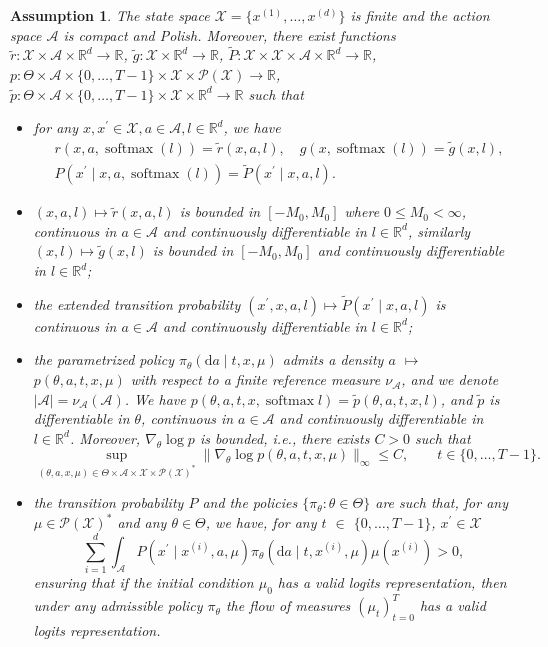 \documentclass[11pt]{article}
\numberwithin{equation}{section}
\newtheorem{assumption}{Assumption}
\theoremstyle{definition}
\theoremstyle{remark}
\def\cA{\mathcal{A}}
\def\cP{\mathcal{P}}
\def\cX{\mathcal{X}}
\def\d{{\mathrm{d}}}
\def\R{{\mathbb R}}
\DeclareMathOperator*{\softmax}{softmax}
\begin{document}
\begin{assumption}
\label{assumption:finite-state-space}
The state space $\cX = \{x^{(1)}, \ldots, x^{(d)} \}$ is finite and the action space $\cA$ is compact and Polish. 
Moreover, there exist functions $\tilde r: \cX \times \cA \times \R^d \to \R$, $\tilde g: \cX \times \R^d \to \R$, $\tilde P: \cX \times \cX \times \cA \times \R^d \to \R$, $p: \Theta \times \cA \times \{0, \ldots, T-1\} \times \cX \times \cP (\cX) \to \R$, $\tilde p: \Theta \times \cA \times \{0, \ldots, T-1\} \times \cX \times \R^d \to \R$ such that
    \begin{itemize}
        \item for any $x,x^\prime \in \cX, a \in \cA, l \in \R^d$, we have 
        $$
        \begin{aligned}
        &r(x,a,\softmax (l)) = \tilde r(x,a,l), \quad 
        g(x,\softmax (l)) = \tilde g(x,l), \\
        & P(x^\prime \mid x,a, \softmax(l)) = \tilde P(x^\prime \mid x, a, l).
        \end{aligned}
        $$ 
        \item $(x,a,l) \mapsto \tilde r(x,a,l)$ is bounded in $[-M_0, M_0]$ where $0 \leq M_0 < \infty$, continuous in $a \in \cA$ and continuously differentiable in $l \in \R^d$, 
        similarly $(x,l) \mapsto \tilde g(x,l)$ is bounded in $[-M_0,M_0]$ and continuously differentiable in $l \in \R^d$;
        \item the extended transition probability $(x^\prime, x, a, l) \mapsto \tilde P (x^\prime \mid x, a, l)$ is continuous in $a \in \cA$ and continuously differentiable in $l \in \R^d$;
        \item the parametrized policy $\pi_\theta(\d a \mid t,x, \mu)$ admits a density $a$ $\mapsto$ $p(\theta, a,t,x,\mu)$ with respect to a finite reference measure $\nu_{\cA}$, and we denote $| \cA | = \nu_\cA (\cA)$. We have $p(\theta,a,t,x,\softmax l) = \tilde p (\theta, a, t,x, l)$, and $\tilde p$ is differentiable in $\theta$, continuous in $a \in \cA$ and continuously differentiable in $l \in \R^d$.
         Moreover, $\nabla_\theta \log p$ is bounded, i.e., there exists $C > 0$ such that 
         $$
         \sup_{(\theta, a, x, \mu) \in \Theta \times \cA \times \cX \times \cP (\cX)^*}\| \nabla_\theta \log p (\theta, a, t,x, \mu) \|_\infty \leq C, \qquad t \in \{0,\ldots,T-1\}. 
         $$
        \item the transition probability $P$ and the policies $\{\pi_\theta: \theta \in \Theta\}$ are such that, for any $\mu \in \cP (\cX)^*$ and any $\theta \in \Theta$, we have, for any $t$ $\in$ $\{0,\ldots,T-1\}$, $x^\prime \in \cX$
        $$
         \sum_{i = 1}^d\int_\cA  P(x^\prime \mid x^{(i)}, a, \mu) \pi_\theta (\d a \mid t,x^{(i)}, \mu) \mu (x^{(i)}) > 0, 
        $$
        ensuring that if the initial condition $\mu_0$ has a valid logits representation, then under any admissible policy $\pi_\theta$ the flow of measures $(\mu_t)_{t=0}^T$ has a valid logits representation.
    \end{itemize}
\end{assumption}
\end{document}
